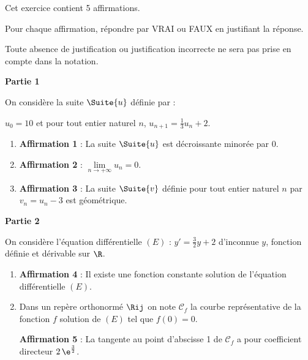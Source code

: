 Cet exercice contient 5 affirmations.

\smallskip

Pour chaque affirmation, répondre par VRAI ou FAUX en justifiant la réponse.

Toute absence de justification ou justification incorrecte ne sera pas prise en compte dans la notation.

\medskip

\textbf{Partie 1}

\medskip

On considère la suite $\Suite{u}$ définie par :

$u_{0}=10$ et pour tout entier naturel $n$, $u_{n+1}=\frac{1}{3} u_{n}+2$.

\begin{enumerate}
	\item \textbf{Affirmation 1} : La suite $\Suite{u}$ est décroissante minorée par $0$.
	\item \textbf{Affirmation 2} : $\lim\limits_{n \to +\infty} u_{n}=0$.
	\item \textbf{Affirmation 3} : La suite $\Suite{v}$ définie pour tout entier naturel $n$ par $v_{n}=u_{n}-3$ est géométrique.
\end{enumerate}

\medskip

\textbf{Partie 2}

\medskip

On considère l'équation différentielle $(E)$ : $y'=\frac{3}{2} y+2$ d'inconnue $y$, fonction définie et dérivable sur $\R$.

\begin{enumerate}
	\item \textbf{Affirmation 4} : Il existe une fonction constante solution de l'équation différentielle $(E)$.
	\item Dans un repère orthonormé $\Rij$ on note $\mathcal{C}_{f}$ la courbe représentative de la fonction $f$ solution de $(E)$ tel que $f(0)=0$.
	
	\textbf{Affirmation 5} : La tangente au point d'abscisse 1 de $\mathcal{C}_{f}$ a pour coefficient directeur $2\,\e^{\frac{3}{2}}$.
\end{enumerate}